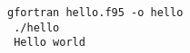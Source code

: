 \begin{Verbatim}[frame=lines,label=hello - commands and output]
 gfortran hello.f95 -o hello
 ./hello
 Hello world
\end{Verbatim}
